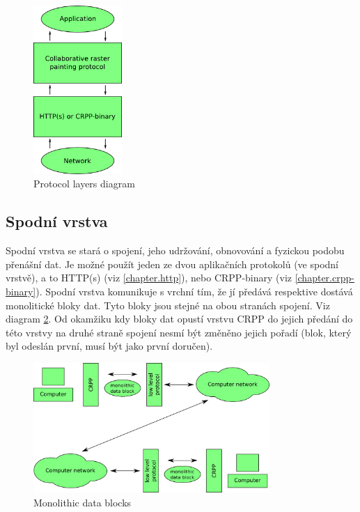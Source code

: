\documentclass[12pt,oneside,a4paper]{report}
\begin{document}
\begin{figure}[h]
  \centering
  \includegraphics[width=0.30\textwidth]{diagrams/protocol_layers.png}
  \caption{Protocol layers diagram}
  \label{picture.protocol_layers}
\end{figure}

\subsection{Spodní vrstva}

Spodní vrstva se stará o spojení, jeho udržování, obnovování a fyzickou podobu přenášní dat. Je možné použít jeden ze dvou aplikačních protokolů (ve spodní vrstvě), a to HTTP(s) (viz \ref{chapter.http}), nebo CRPP-binary (viz \ref{chapter.crpp-binary}). Spodní vrstva komunikuje s vrchní tím, že jí předává respektive dostává monolitické bloky dat. Tyto bloky jsou stejné na obou stranách spojení. Viz diagram \ref{picture.monolithic_data_blocks}. Od okamžiku kdy bloky dat opustí vrstvu CRPP do jejich předání do této vrstvy na druhé straně spojení nesmí být změněno jejich pořadí (blok, který byl odeslán první, musí být jako první doručen).

\begin{figure}[h]
  \centering
  \includegraphics[width=0.80\textwidth]{diagrams/monolithic_data_blocks.png}
  \caption{Monolithic data blocks}
  \label{picture.monolithic_data_blocks}
\end{figure}
\end{document}
